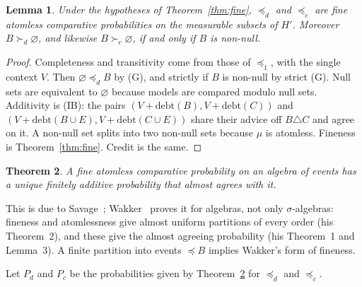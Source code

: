 \documentclass[11pt]{article}
\newtheorem{theorem}{Theorem}
\newtheorem{lemma}[theorem]{Lemma}
\theoremstyle{definition}\newtheorem{definition}[theorem]{Definition}
\theoremstyle{remark}\newtheorem{remark}[theorem]{Remark}
\newcommand{\debt}{\mathrm{debt}}
\begin{document}
\begin{lemma}\label{lem:cp}
Under the hypotheses of Theorem~\ref{thm:fine}, $\preceq_d$ and $\preceq_c$
are fine atomless comparative probabilities on the measurable subsets of
$H'$. Moreover $B\succ_d\varnothing$, and likewise $B\succ_c\varnothing$, if
and only if $B$ is non-null.
\end{lemma}
\begin{proof}
Completeness and transitivity come from those of $\preceq_1$, with the single
context $V$. Then $\varnothing\preceq_dB$ by (G), and strictly if $B$ is
non-null by strict (G). Null sets are equivalent to $\varnothing$ because
models are compared modulo null sets. Additivity is (IB): the pairs
$(V+\debt(B),V+\debt(C))$ and $(V+\debt(B\cup E),V+\debt(C\cup E))$ share
their advice off $B\triangle C$ and agree on it. A non-null set splits into
two non-null sets because $\mu$ is atomless. Fineness is
Theorem~\ref{thm:fine}. Credit is the same.
\end{proof}

\begin{theorem}\label{thm:SW}
A fine atomless comparative probability on an algebra of events has a unique
finitely additive probability that almost agrees with it.
\end{theorem}
This is due to Savage~\cite[\S3.3]{Savage}; Wakker~\cite{Wakker} proves it for
algebras, not only $\sigma$-algebras: fineness and atomlessness give almost
uniform partitions of every order (his Theorem~2), and these give the almost
agreeing probability (his Theorem~1 and Lemma~3). A finite partition into
events $\preceq B$ implies Wakker's form of fineness.

Let $P_d$ and $P_c$ be the probabilities given by Theorem~\ref{thm:SW} for
$\preceq_d$ and $\preceq_c$.
\end{document}
